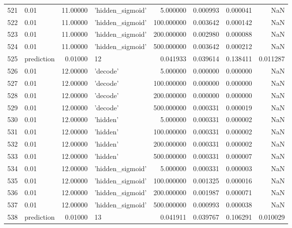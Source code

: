 \documentclass[10pt,a4paper]{article}
\begin{document}
\begin{tabular}{llrlrrrr}
521  &        0.01 &  11.00000 &   'hidden\_sigmoid' &    5.000000 &  0.000993 &  0.000041 &       NaN \\
522  &        0.01 &  11.00000 &   'hidden\_sigmoid' &  100.000000 &  0.003642 &  0.000142 &       NaN \\
523  &        0.01 &  11.00000 &   'hidden\_sigmoid' &  200.000000 &  0.002980 &  0.000088 &       NaN \\
524  &        0.01 &  11.00000 &   'hidden\_sigmoid' &  500.000000 &  0.003642 &  0.000212 &       NaN \\
525  &  prediction &   0.01000 &                 12 &    0.041933 &  0.039614 &  0.138411 &  0.011287 \\
526  &        0.01 &  12.00000 &           'decode' &    5.000000 &  0.000000 &  0.000000 &       NaN \\
527  &        0.01 &  12.00000 &           'decode' &  100.000000 &  0.000000 &  0.000000 &       NaN \\
528  &        0.01 &  12.00000 &           'decode' &  200.000000 &  0.000000 &  0.000000 &       NaN \\
529  &        0.01 &  12.00000 &           'decode' &  500.000000 &  0.000331 &  0.000019 &       NaN \\
530  &        0.01 &  12.00000 &           'hidden' &    5.000000 &  0.000331 &  0.000002 &       NaN \\
531  &        0.01 &  12.00000 &           'hidden' &  100.000000 &  0.000331 &  0.000002 &       NaN \\
532  &        0.01 &  12.00000 &           'hidden' &  200.000000 &  0.000331 &  0.000002 &       NaN \\
533  &        0.01 &  12.00000 &           'hidden' &  500.000000 &  0.000331 &  0.000007 &       NaN \\
534  &        0.01 &  12.00000 &   'hidden\_sigmoid' &    5.000000 &  0.000331 &  0.000003 &       NaN \\
535  &        0.01 &  12.00000 &   'hidden\_sigmoid' &  100.000000 &  0.001325 &  0.000016 &       NaN \\
536  &        0.01 &  12.00000 &   'hidden\_sigmoid' &  200.000000 &  0.001987 &  0.000071 &       NaN \\
537  &        0.01 &  12.00000 &   'hidden\_sigmoid' &  500.000000 &  0.000993 &  0.000038 &       NaN \\
538  &  prediction &   0.01000 &                 13 &    0.041911 &  0.039767 &  0.106291 &  0.010029 \\

\end{tabular}
\end{document}
